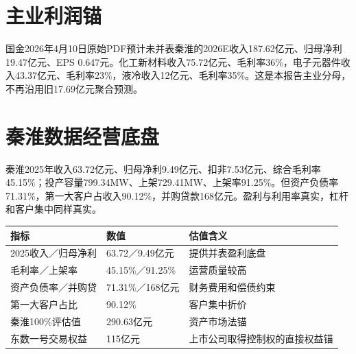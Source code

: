 \section{主业利润锚}

国金2026年4月10日原始PDF预计未并表秦淮的2026E收入187.62亿元、归母净利19.47亿元、EPS 0.647元。化工新材料收入75.72亿元、毛利率36\%，电子元器件收入43.37亿元、毛利率23\%，液冷收入12亿元、毛利率35\%。这是本报告主业分母，不再沿用旧17.69亿元聚合预测。

\section{秦淮数据经营底盘}

秦淮2025年收入63.72亿元、归母净利9.49亿元、扣非7.53亿元、综合毛利率45.15\%；投产容量799.34MW、上架729.41MW、上架率91.25\%。但资产负债率71.31\%，第一大客户占收入90.12\%，并购贷款168亿元。盈利与利用率真实，杠杆和客户集中同样真实。

\begin{exhibitbox}[秦淮经营与交易锚]
\noindent\begin{tabularx}{\textwidth}{L{3.2cm}R{2.1cm}X}
\toprule
\textbf{指标} & \textbf{数值} & \textbf{估值含义} \\
\midrule
2025收入／归母净利 & 63.72／9.49亿元 & 提供并表盈利底盘 \\
毛利率／上架率 & 45.15\%／91.25\% & 运营质量较高 \\
资产负债率／并购贷 & 71.31\%／168亿元 & 财务费用和偿债约束 \\
第一大客户占比 & 90.12\% & 客户集中折价 \\
秦淮100\%评估值 & 290.63亿元 & 资产市场法锚 \\
东数一号交易权益 & 115亿元 & 上市公司取得控制权的直接权益锚 \\
\bottomrule
\end{tabularx}
\end{exhibitbox}
